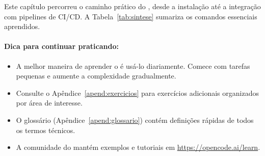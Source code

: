 Este capítulo percorreu o caminho prático do \opencodeeco{}, desde a
instalação até a integração com pipelines de CI/CD. A Tabela~\ref{tab:sintese}
sumariza os comandos essenciais aprendidos.

\begin{table}[htb]
\centering
    \small
\caption{Comandos essenciais do OpenCode Ecosystem}
\label{tab:sintese}
\end{table}

\paragraph{Dica para continuar praticando:}
\begin{itemize}
\item A melhor maneira de aprender o \opencodeeco{} é usá-lo
      diariamente. Comece com tarefas pequenas e aumente a
      complexidade gradualmente.
\item Consulte o Apêndice~\ref{apend:exercicios} para exercícios
      adicionais organizados por área de interesse.
\item O glossário (Apêndice~\ref{apend:glossario}) contém
      definições rápidas de todos os termos técnicos.
\item A comunidade do \opencodeeco{} mantém exemplos e tutoriais em
      \url{https://opencode.ai/learn}.
\end{itemize}
